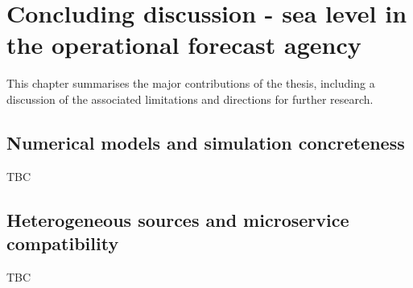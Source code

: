 
\chapter{Concluding discussion - sea level in the operational forecast agency}\label{c:conclusions}


This chapter summarises the major contributions of the thesis, including a discussion of the associated limitations and directions for further research.



\section{Numerical models and simulation concreteness}
TBC


\section{Heterogeneous sources and microservice compatibility}


TBC



